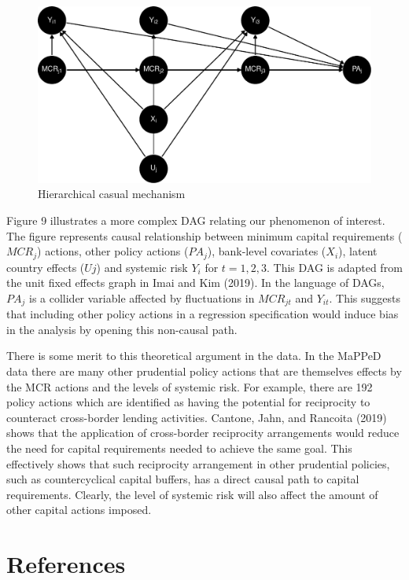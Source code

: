 \documentclass[
  10pt,
]{article}
\begin{document}
\begin{figure}[H]
\includegraphics{figures/paper-panel_dag-1} \caption{Hierarchical casual mechanism}\label{fig:panel_dag}
\end{figure}

Figure 9 illustrates a more complex DAG relating our phenomenon of
interest. The figure represents causal relationship between minimum
capital requirements (\(MCR_j\)) actions, other policy actions
(\(PA_j\)), bank-level covariates (\(X_i\)), latent country effects
(\(Uj\)) and systemic risk \(Y_i\) for \(t=1,2,3\). This DAG is adapted
from the unit fixed effects graph in Imai and Kim (2019). In the
language of DAGs, \(PA_j\) is a collider variable affected by
fluctuations in \(MCR_{jt}\) and \(Y_{it}\). This suggests that
including other policy actions in a regression specification would
induce bias in the analysis by opening this non-causal path.

There is some merit to this theoretical argument in the data. In the
MaPPeD data there are many other prudential policy actions that are
themselves effects by the MCR actions and the levels of systemic risk.
For example, there are 192 policy actions which are identified as having
the potential for reciprocity to counteract cross-border lending
activities. Cantone, Jahn, and Rancoita (2019) shows that the
application of cross-border reciprocity arrangements would reduce the
need for capital requirements needed to achieve the same goal. This
effectively shows that such reciprocity arrangement in other prudential
policies, such as countercyclical capital buffers, has a direct causal
path to capital requirements. Clearly, the level of systemic risk will
also affect the amount of other capital actions imposed.

\hypertarget{references}{%
\section{References}\label{references}}
\end{document}
